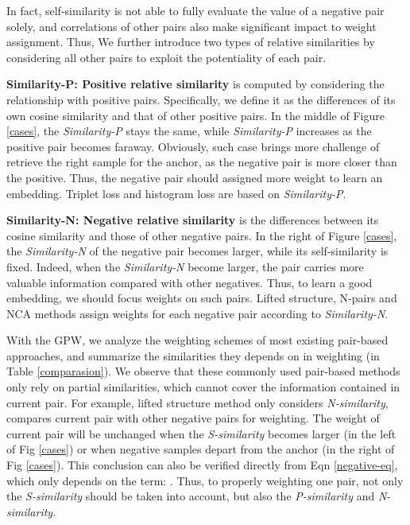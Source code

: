 \documentclass[10pt,twocolumn,letterpaper]{article}
\begin{document}
In fact, self-similarity is not able to fully evaluate the value of a negative pair solely, and correlations of other pairs also make significant impact to weight assignment. Thus, We further introduce two types of relative similarities by considering all other pairs to exploit the potentiality of each pair.

{\bf Similarity-P: Positive relative similarity} is computed by considering the relationship with positive pairs. Specifically, we define it as the differences of its own cosine similarity and that of other positive pairs. In the middle of Figure \ref{cases}, the \emph{Similarity-P} stays the same, while \emph{Similarity-P} increases as the positive pair becomes faraway. Obviously, such case brings more challenge of retrieve the right sample for the anchor, as the negative pair is more closer than the positive. Thus, the negative pair should assigned more weight to learn an embedding. Triplet loss and histogram loss are based on \emph{Similarity-P}.

{\bf Similarity-N: Negative relative similarity} is the differences between its cosine similarity and those of other negative pairs. In the right of Figure \ref{cases}, the \emph{Similarity-N} of the negative pair becomes larger, while its self-similarity is fixed. Indeed, when the \emph{Similarity-N} become larger, the pair carries more valuable information compared with other negatives. Thus, to learn a good embedding, we should focus weights on such pairs. Lifted structure, N-pairs and NCA methods assign weights for each negative pair according to \emph{Similarity-N}.

With the GPW, we analyze the weighting schemes of most existing pair-based approaches, and summarize the similarities they depends on in weighting (in Table \ref{comparasion}). We observe that these commonly used pair-based methods only rely on partial similarities, which cannot cover the information contained in current pair. 
For example, lifted structure method only considers \emph{N-similarity}, compares current pair with other negative pairs for weighting. The weight of current pair will be unchanged when the \emph{S-similarity} becomes larger (in the left of Fig \ref{cases}) or when negative samples depart from the anchor (in the right of Fig \ref{cases}). This conclusion can also be verified directly from Eqn \ref{negative-eq}, which only depends on the term: . Thus, to properly weighting one pair, not only the \emph{S-similarity} should be taken into account, but also the \emph{P-similarity} and \emph{N-similarity}.
 
\end{document}
